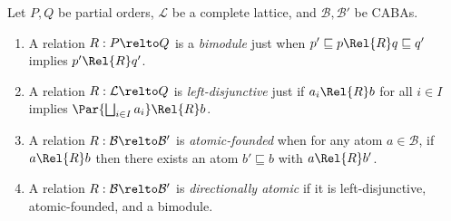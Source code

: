 \begin{definition}
  Let $P, Q$ be partial orders, $\mathcal{L}$ be a complete lattice, and
  $\mathcal{B}, \mathcal{B}'$ be CABAs.
  \begin{enumerate}
    \item A relation \(R : P \relto Q\) is a \emph{bimodule} just when \(p'
      \sqsubseteq p \Rel{R} q \sqsubseteq q'\) implies \(p' \Rel{R} q'\).
    \item A relation \(R : \mathcal{L} \relto Q\) is \emph{left-disjunctive}
      just if \(a_i \Rel{R} b\) for all $i \in I$ implies \(\Par{\bigsqcup_{i
      \in I} a_i} \Rel{R} b\).
    \item A relation \(R : \mathcal{B} \relto \mathcal{B}'\) is
      \emph{atomic-founded} when for any atom \(a \in \mathcal{B}\), if \(a
      \Rel{R} b\) then there exists an atom \(b' \sqsubseteq b\) with \(a
      \Rel{R} b'\).
    \item A relation \(R : \mathcal{B} \relto \mathcal{B}'\) is
      \emph{directionally atomic} if it is left-disjunctive,
      atomic-founded, and a bimodule.
  \end{enumerate}
\end{definition}

